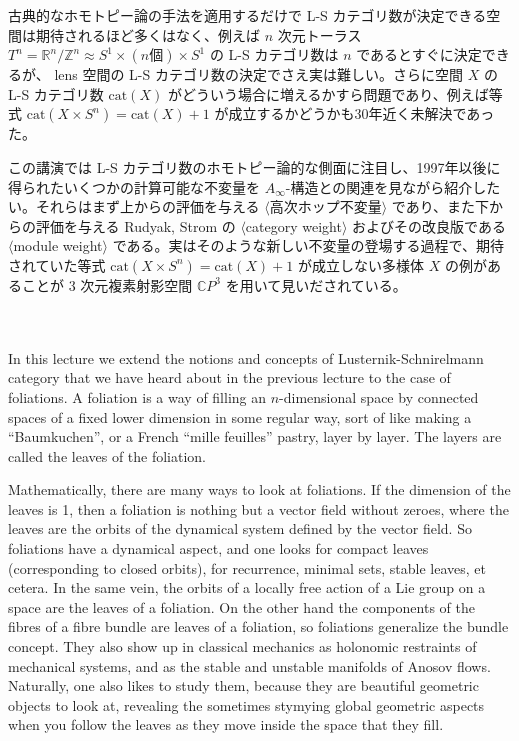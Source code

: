 \documentclass[uplatex,dvipdfmx]{jlreq}
\begin{document}
古典的なホモトピー論の手法を適用するだけで L-S カテゴリ数が決定できる空間は期待されるほど多くはなく、例えば $n$ 次元トーラス
$T^n = \mathbb{R}^n/\mathbb{Z}^n \approx S^1 \times (n \mbox{個})\times S^1$
の L-S カテゴリ数は $n$ であるとすぐに決定できるが、
lens 空間の L-S カテゴリ数の決定でさえ実は難しい。さらに空間 $X$ の L-S カテゴリ数 $\mathrm{cat}(X)$ がどういう場合に増えるかすら問題であり、例えば等式
$\mathrm{cat}(X \times S^n) =\mathrm{cat}(X)+1$
が成立するかどうかも30年近く未解決であった。

この講演では L-S カテゴリ数のホモトピー論的な側面に注目し、1997年以後に得られたいくつかの計算可能な不変量を $A_\infty$-構造との関連を見ながら紹介したい。それらはまず上からの評価を与える $\langle$高次ホップ不変量$\rangle$ であり、また下からの評価を与える Rudyak, Strom の $\langle$category weight$\rangle$ およびその改良版である $\langle$module weight$\rangle$ である。実はそのような新しい不変量の登場する過程で、期待されていた等式 $\mathrm{cat}(X \times S^n) =\mathrm{cat}(X)+1$ が成立しない多様体 $X$ の例があることが 3 次元複素射影空間 $\mathbb{C}P^3$ を用いて見いだされている。

\newpage
\\
~\hspace*{\fill}{\large\bfseries Elmar VOGT (University of Tokyo / Free University of Berlin)}\\

In this lecture we extend the notions and concepts of Lusternik-Schnirelmann category that we have heard about in the previous lecture to the case of foliations. A foliation is a way of filling an $n$-dimensional space by connected spaces of a fixed lower dimension in some regular way, sort of like making a ``Baumkuchen'', or a French ``mille feuilles'' pastry, layer by layer. The layers are called the leaves of the foliation.

Mathematically, there are many ways to look at foliations. If the dimension of the leaves is 1, then a foliation is nothing but a vector field without zeroes, where the leaves are the orbits of the dynamical system defined by the vector field. So foliations have a dynamical aspect, and one looks for compact leaves (corresponding to closed orbits), for recurrence, minimal sets, stable leaves, et cetera. In the same vein, the orbits of a locally free action of a Lie group on a space are the leaves of a foliation. On the other hand the components of the fibres of a fibre bundle are leaves of a foliation, so foliations generalize the bundle concept. They also show up in classical mechanics as holonomic restraints of mechanical systems, and as the stable and unstable manifolds of Anosov flows. Naturally, one also likes to study them, because they are beautiful geometric objects to look at, revealing the sometimes stymying global geometric aspects when you follow the leaves as they move inside the space that they fill.
\end{document}

